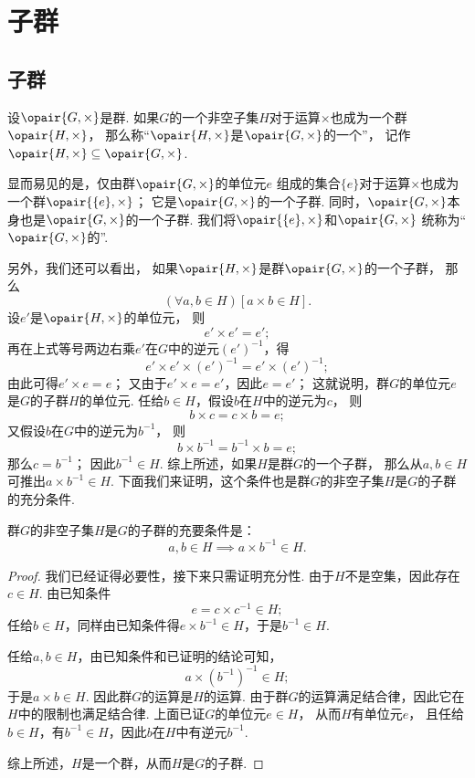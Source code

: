 \section{子群}
\subsection{子群}
\begin{definition}
设\(\opair{G,\times}\)是群.
如果\(G\)的一个非空子集\(H\)对于运算\(\times\)也成为一个群\(\opair{H,\times}\)，
那么称“\(\opair{H,\times}\)是\(\opair{G,\times}\)的一个”，
记作\(\opair{H,\times} \subseteq \opair{G,\times}\).
\end{definition}

显而易见的是，仅由群\(\opair{G,\times}\)的单位元\(e\)%
组成的集合\(\{e\}\)对于运算\(\times\)也成为一个群\(\opair{\{e\},\times}\)；
它是\(\opair{G,\times}\)的一个子群.
同时，\(\opair{G,\times}\)本身也是\(\opair{G,\times}\)的一个子群.
我们将\(\opair{\{e\},\times}\)和\(\opair{G,\times}\)%
统称为“\(\opair{G,\times}\)的”.

另外，我们还可以看出，
如果\(\opair{H,\times}\)是群\(\opair{G,\times}\)的一个子群，
那么\[
	(\forall a,b \in H)[a \times b \in H].
\]
设\(e'\)是\(\opair{H,\times}\)的单位元，
则\[
	e' \times e' = e';
\]
再在上式等号两边右乘\(e'\)在\(G\)中的逆元\((e')^{-1}\)，得\[
	e' \times e' \times (e')^{-1} = e' \times (e')^{-1};
\]
由此可得\(e' \times e = e\)；
又由于\(e' \times e = e'\)，因此\(e = e'\)；
这就说明，群\(G\)的单位元\(e\)是\(G\)的子群\(H\)的单位元.
任给\(b \in H\)，假设\(b\)在\(H\)中的逆元为\(c\)，
则\[
	b \times c = c \times b = e;
\]
又假设\(b\)在\(G\)中的逆元为\(b^{-1}\)，
则\[
	b \times b^{-1} = b^{-1} \times b = e;
\]
那么\(c = b^{-1}\)；
因此\(b^{-1} \in H\).
综上所述，如果\(H\)是群\(G\)的一个子群，
那么从\(a,b \in H\)可推出\(a \times b^{-1} \in H\).
下面我们来证明，这个条件也是群\(G\)的非空子集\(H\)是\(G\)的子群的充分条件.
\begin{theorem}
群\(G\)的非空子集\(H\)是\(G\)的子群的充要条件是：\[
	a,b \in H \implies a \times b^{-1} \in H.
\]
\begin{proof}
我们已经证得必要性，接下来只需证明充分性.
由于\(H\)不是空集，因此存在\(c \in H\).
由已知条件\[
	e = c \times c^{-1} \in H;
\]
任给\(b \in H\)，同样由已知条件得\(e \times b^{-1} \in H\)，于是\(b^{-1} \in H\).

任给\(a,b \in H\)，由已知条件和已证明的结论可知，\[
	a \times (b^{-1})^{-1} \in H;
\]于是\(a \times b \in H\).
因此群\(G\)的运算是\(H\)的运算.
由于群\(G\)的运算满足结合律，因此它在\(H\)中的限制也满足结合律.
上面已证\(G\)的单位元\(e \in H\)，
从而\(H\)有单位元\(e\)，
且任给\(b \in H\)，有\(b^{-1} \in H\)，因此\(b\)在\(H\)中有逆元\(b^{-1}\).

综上所述，\(H\)是一个群，从而\(H\)是\(G\)的子群.
\end{proof}
\end{theorem}

